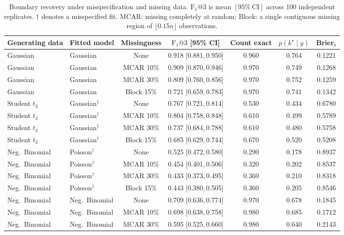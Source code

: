 \begin{table}[!htbp]
\centering
\footnotesize
\caption{Boundary recovery under misspecification and missing data. $\mathrm{F_1}@3$ is mean $[95\%\ \mathrm{CI}]$ across 100 independent replicates. $\dag$ denotes a misspecified fit. MCAR: missing completely at random; Block: a single contiguous missing region of $\lfloor 0.15n \rfloor$ observations.}
\label{tab:E07-robustness}
\begin{tabular}{llccccc}
\toprule
Generating data & Fitted model & Missingness & $\mathrm{F_1}@3$ [95\% CI] & Count exact & $p(k^\star\!\mid y)$ & Brier$_k$ \\
\midrule
Gaussian & Gaussian & None         & 0.918 [0.881,\,0.950] & 0.960 & 0.764 & 0.1221 \\
Gaussian & Gaussian & MCAR 10\%   & 0.909 [0.870,\,0.946] & 0.970 & 0.749 & 0.1268 \\
Gaussian & Gaussian & MCAR 30\%   & 0.809 [0.760,\,0.856] & 0.970 & 0.752 & 0.1259 \\
Gaussian & Gaussian & Block 15\%  & 0.721 [0.659,\,0.783] & 0.970 & 0.741 & 0.1342 \\
Student $t_3$ & Gaussian$^\dag$ & None        & 0.767 [0.721,\,0.814] & 0.530 & 0.434 & 0.6780 \\
Student $t_3$ & Gaussian$^\dag$ & MCAR 10\%  & 0.804 [0.758,\,0.848] & 0.610 & 0.499 & 0.5789 \\
Student $t_3$ & Gaussian$^\dag$ & MCAR 30\%  & 0.737 [0.684,\,0.788] & 0.610 & 0.480 & 0.5758 \\
Student $t_3$ & Gaussian$^\dag$ & Block 15\% & 0.685 [0.629,\,0.744] & 0.670 & 0.520 & 0.5208 \\
Neg.\ Binomial & Poisson$^\dag$ & None        & 0.525 [0.472,\,0.580] & 0.290 & 0.178 & 0.8937 \\
Neg.\ Binomial & Poisson$^\dag$ & MCAR 10\%  & 0.454 [0.401,\,0.506] & 0.320 & 0.202 & 0.8537 \\
Neg.\ Binomial & Poisson$^\dag$ & MCAR 30\%  & 0.433 [0.373,\,0.495] & 0.360 & 0.210 & 0.8318 \\
Neg.\ Binomial & Poisson$^\dag$ & Block 15\% & 0.443 [0.380,\,0.505] & 0.360 & 0.205 & 0.8546 \\
Neg.\ Binomial & Neg.\ Binomial & None        & 0.709 [0.636,\,0.774] & 0.970 & 0.678 & 0.1845 \\
Neg.\ Binomial & Neg.\ Binomial & MCAR 10\%  & 0.698 [0.638,\,0.758] & 0.980 & 0.685 & 0.1712 \\
Neg.\ Binomial & Neg.\ Binomial & MCAR 30\%  & 0.595 [0.525,\,0.660] & 0.980 & 0.640 & 0.2143 \\

\end{tabular}
\end{table}
